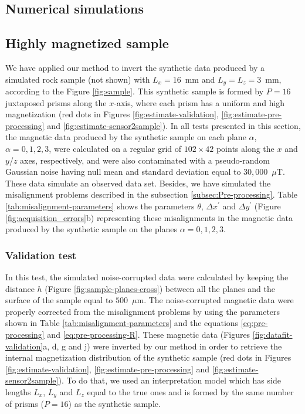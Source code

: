 \documentclass[draft,gc]{agutex}
\begin{document}
\begin{article}
\section{Numerical simulations}
\label{sec:Numerical simulations}

\subsection{Highly magnetized sample}

We have applied our method to invert the synthetic data produced
by a simulated rock sample (not shown) with $L_{x} = 16$~mm and 
$L_{y} = L_{z} = 3$~mm, according to the Figure \ref{fig:sample}.
This synthetic sample is formed by $P = 16$ juxtaposed prisms along 
the $x$-axis, where each prism has a uniform and high magnetization
(red dots in Figures \ref{fig:estimate-validation},
\ref{fig:estimate-pre-processing} and \ref{fig:estimate-sensor2sample}).
In all tests presented in this section, 
the magnetic data produced by the synthetic sample on 
each plane $\alpha$, $\alpha = 0, 1, 2, 3$, were calculated on
a regular grid of $102 \times 42$ points along the $x$ and 
$y$/$z$ axes, respectively, and were also contaminated with a 
pseudo-random Gaussian noise having null mean and standard 
deviation equal to $30,000$~$\mu$T. These data simulate
an observed data set.
Besides, we have simulated the misalignment problems 
described in the subsection \ref{subsec:Pre-processing}.
Table \ref{tab:misalignment-parameters} shows the parameters
$\theta$, $\Delta x^{\prime}$ and $\Delta y^{\prime}$ (Figure 
\ref{fig:acquisition_errors}b) representing these misalignments
in the magnetic data produced by the synthetic sample on
the planes $\alpha = 0, 1, 2, 3$.

\subsubsection{Validation test}
\label{subsec:Validation test}

In this test, the simulated noise-corrupted data were calculated 
by keeping the distance $h$ (Figure \ref{fig:sample-planes-cross}) 
between all the planes and the surface of the sample equal to 
$500$~$\mu$m.
The noise-corrupted magnetic data were properly corrected 
from the misalignment problems by using the parameters shown in 
Table \ref{tab:misalignment-parameters} and the equations 
\ref{eq:pre-processing} and \ref{eq:pre-processing-R}.
These magnetic data (Figures \ref{fig:datafit-validation}a, d, g and j)
were inverted by our method in order to retrieve the internal
magnetization distribution of the synthetic sample
(red dots in Figures \ref{fig:estimate-validation},
\ref{fig:estimate-pre-processing} and \ref{fig:estimate-sensor2sample}).
To do that, we used an interpretation model which has side lengths 
$L_{x}$, $L_{y}$ and $L_{z}$ equal to the true ones and is
formed by the same number of prisms ($P = 16$) as the synthetic sample.


\end{article}
\end{document}
